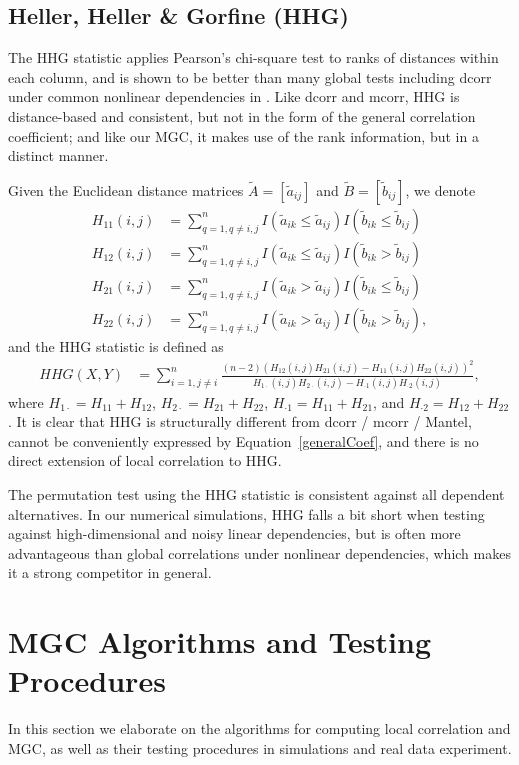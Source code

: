 \documentclass[11pt]{article}
\begin{document}
\subsection{Heller, Heller \& Gorfine (HHG)}
\label{appen:hhg}
The HHG statistic applies Pearson's chi-square test to ranks of distances within each column, and is shown to be better than many global tests including dcorr under common nonlinear dependencies in \cite{GorfineHellerHeller2012, HellerGorfine2013}. Like dcorr and mcorr, HHG is distance-based and consistent, but not in the form of the general correlation coefficient; and like our MGC, it makes use of the rank information, but in a distinct manner.

Given the Euclidean distance matrices $\tilde{A}=[\tilde{a}_{ij}]$ and $\tilde{B}=[\tilde{b}_{ij}]$, we denote
\begin{align*}
H_{11}(i,j) &= \sum_{q=1,q\neq i,j}^{n}I(\tilde{a}_{ik} \leq \tilde{a}_{ij})I(\tilde{b}_{ik} \leq \tilde{b}_{ij}) \\
H_{12}(i,j) &= \sum_{q=1,q\neq i,j}^{n}I(\tilde{a}_{ik} \leq \tilde{a}_{ij})I(\tilde{b}_{ik} > \tilde{b}_{ij}) \\
H_{21}(i,j) &= \sum_{q=1,q\neq i,j}^{n}I(\tilde{a}_{ik} > \tilde{a}_{ij})I(\tilde{b}_{ik} \leq \tilde{b}_{ij}) \\
H_{22}(i,j) &= \sum_{q=1,q\neq i,j}^{n}I(\tilde{a}_{ik} > \tilde{a}_{ij})I(\tilde{b}_{ik} > \tilde{b}_{ij}),
\end{align*}
and the HHG statistic is defined as
\begin{align*}
HHG(X,Y) &= \sum_{i=1,j\neq i}^{n} \frac{(n-2)(H_{12}(i,j)H_{21}(i,j)-H_{11}(i,j)H_{22}(i,j))^2}{H_{1 \cdot}(i,j)H_{2 \cdot}(i,j)-H_{\cdot 1}(i,j)H_{\cdot 2}(i,j)},
\end{align*}
where $H_{1 \cdot}=H_{11}+H_{12}$, $H_{2 \cdot}=H_{21}+H_{22}$, $H_{\cdot 1}=H_{11}+H_{21}$, and $H_{\cdot 2}=H_{12}+H_{22}$. It is clear that HHG is structurally different from dcorr / mcorr / Mantel, cannot be conveniently expressed by Equation~\ref{generalCoef}, and there is no direct extension of local correlation to HHG.

The permutation test using the HHG statistic is consistent against all dependent alternatives. In our numerical simulations, HHG falls a bit short when testing against high-dimensional and noisy linear dependencies, but is often more advantageous than global correlations under nonlinear dependencies, which makes it a strong competitor in general. 

\section{MGC Algorithms and Testing Procedures}
\label{appen:tests}
In this section we elaborate on the algorithms for computing local correlation and MGC, as well as their testing procedures in simulations and real data experiment. 
\end{document}
